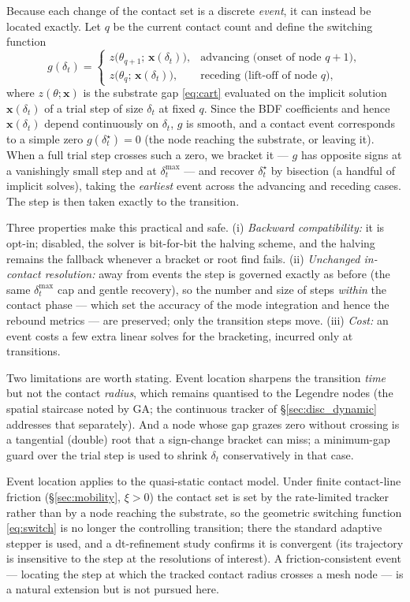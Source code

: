\documentclass{jfm}
\newcommand{\be}{\begin{equation}}
\newcommand{\ee}{\end{equation}}
\begin{document}
Because each change of the contact set is a discrete \emph{event}, it can instead be
located exactly. Let $q$ be the current contact count and define the switching function
\be\label{eq:switch}
g(\delta_t)=
\begin{cases}
z\big(\theta_{q+1};\,\mathbf x(\delta_t)\big), & \text{advancing (onset of node $q{+}1$)},\\
z\big(\theta_{q};\,\mathbf x(\delta_t)\big),   & \text{receding (lift-off of node $q$)},
\end{cases}
\ee
where $z(\theta;\mathbf x)$ is the substrate gap \eqref{eq:cart} evaluated on the implicit
solution $\mathbf x(\delta_t)$ of a trial step of size $\delta_t$ at fixed $q$. Since the
BDF coefficients and hence $\mathbf x(\delta_t)$ depend continuously on $\delta_t$,
$g$ is smooth, and a contact event corresponds to a simple zero $g(\delta_t^\star)=0$
(the node reaching the substrate, or leaving it). When a full trial step crosses such a
zero, we bracket it --- $g$ has opposite signs at a vanishingly small step and at
$\delta_t^{\max}$ --- and recover $\delta_t^\star$ by bisection (a handful of implicit
solves), taking the \emph{earliest} event across the advancing and receding cases. The
step is then taken exactly to the transition.

Three properties make this practical and safe. (i) \emph{Backward compatibility:} it is
opt-in; disabled, the solver is bit-for-bit the halving scheme, and the halving remains
the fallback whenever a bracket or root find fails. (ii) \emph{Unchanged in-contact
resolution:} away from events the step is governed exactly as before (the same
$\delta_t^{\max}$ cap and gentle recovery), so the number and size of steps \emph{within}
the contact phase --- which set the accuracy of the mode integration and hence the
rebound metrics --- are preserved; only the transition steps move. (iii) \emph{Cost:} an
event costs a few extra linear solves for the bracketing, incurred only at transitions.

Two limitations are worth stating. Event location sharpens the transition \emph{time} but
not the contact \emph{radius}, which remains quantised to the Legendre nodes (the spatial
staircase noted by GA; the continuous tracker of \S\ref{sec:disc_dynamic} addresses that
separately). And a node whose gap grazes zero without crossing is a tangential (double)
root that a sign-change bracket can miss; a minimum-gap guard over the trial step is used
to shrink $\delta_t$ conservatively in that case.

Event location applies to the quasi-static contact model. Under finite contact-line
friction (\S\ref{sec:mobility}, $\xi>0$) the contact set is set by the rate-limited
tracker rather than by a node reaching the substrate, so the geometric switching function
\eqref{eq:switch} is no longer the controlling transition; there the standard adaptive
stepper is used, and a dt-refinement study confirms it is convergent (its trajectory is
insensitive to the step at the resolutions of interest). A friction-consistent event
--- locating the step at which the tracked contact radius crosses a mesh node --- is a
natural extension but is not pursued here.
\end{document}
